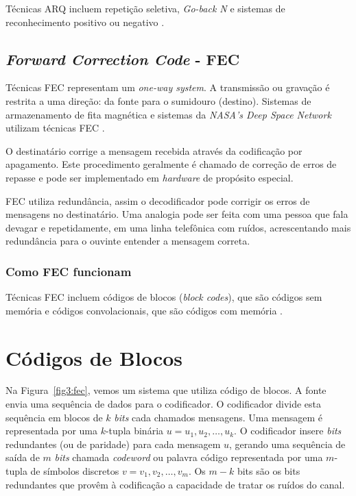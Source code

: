 Técnicas ARQ incluem repetição seletiva, \emph{Go-back N} e sistemas de reconhecimento positivo ou negativo \cite{Kurose:2010}.

\subsection{\emph{Forward Correction Code} - FEC}

Técnicas FEC representam um \emph{one-way system}. A transmissão ou gravação é restrita a uma direção: da fonte para o sumidouro (destino). Sistemas de armazenamento de fita magnética e sistemas da \emph{NASA's Deep Space Network} utilizam técnicas FEC \cite{Lin:1983}.

O destinatário corrige a mensagem recebida através da codificação por apagamento. Este procedimento geralmente é chamado de correção de erros de repasse e pode ser implementado em \emph{hardware} de propósito especial.

FEC utiliza redundância, assim o decodificador pode corrigir os erros de mensagens no destinatário. Uma analogia pode ser feita com uma pessoa que fala devagar e repetidamente, em uma linha telefônica com ruídos, acrescentando mais redundância para o ouvinte entender a mensagem correta.

\subsubsection{Como FEC funcionam}

Técnicas FEC incluem códigos de blocos (\emph{block codes}), que são códigos sem memória e códigos convolacionais, que são códigos com memória \cite{Berlekamp:1987}. 

\section{Códigos de Blocos}

Na Figura~\ref{fig3:fec}, vemos um sistema que utiliza código de
blocos. A fonte envia uma sequência de dados para o codificador. O
codificador divide esta sequência em blocos de $k$ \emph{bits}
cada chamados mensagens.  Uma mensagem é representada por uma
$k$-tupla binária $u = u_1, u_2,\dots, u_k$. O codificador insere
\emph{bits} redundantes (ou de paridade) para cada mensagem $u$,
gerando uma sequência de saída de $m$ \emph{bits} chamada
\emph{codeword} ou palavra código representada por uma $m$-tupla de
símbolos discretos $v = v_1, v_2, \dots, v_m$.  Os $m - k$ bits são os
bits redundantes que provêm à codificação a capacidade de tratar os
ruídos do canal.

